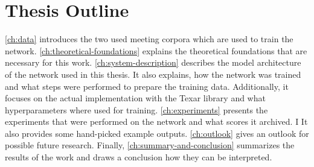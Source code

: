
\section{Thesis Outline}

\autoref{ch:data} introduces the two used meeting corpora which are used to train the network.
\autoref{ch:theoretical-foundations} explains the theoretical foundations that are necessary for this work.
\autoref{ch:system-description} describes the model architecture of the network used in this thesis.
It also explains, how the network was trained and what steps were performed to prepare the training data.
Additionally, it focuses on the actual implementation with the Texar library \cite{hu2019texar} and what hyperparameters where used for training.
\autoref{ch:experiments} presents the experiments that were performed on the network and what scores it archived. I
It also provides some hand-picked example outputs.
\autoref{ch:outlook} gives an outlook for possible future research.
Finally, \autoref{ch:summary-and-conclusion} summarizes the results of the work and draws a conclusion how they can be interpreted.
